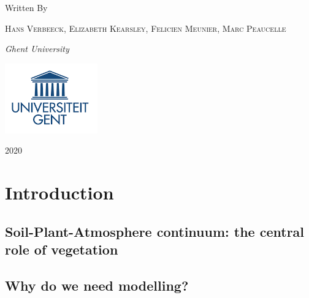 \documentclass[]{book}
\begin{document}
\begin{titlepage}
	Written By
	
	\vspace{0.5\baselineskip} %
	
	{\scshape Hans Verbeeck, Elizabeth Kearsley, Felicien Meunier, Marc Peaucelle \\} %
	
	\vspace{0.5\baselineskip} %
	
	\textit{Ghent University \\} %
	
	\vfill %
	
	
	
	\includegraphics[width=40mm]{figures/UGhent.png}
	
	\vspace{0.3\baselineskip} %
	
	2020 %
	

\end{titlepage}

{
\setcounter{tocdepth}{1}
\tableofcontents
}
\chapter{Introduction}\label{intro}

\section{Soil-Plant-Atmosphere continuum: the central role of
vegetation}\label{soil-plant-atmosphere-continuum-the-central-role-of-vegetation}

\section{Why do we need modelling?}\label{why-do-we-need-modelling}
\end{document}
